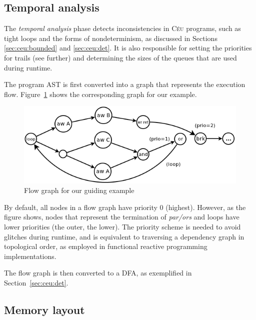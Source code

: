\documentclass[11pt,a4paper]{article}
\newcommand{\2}{\;\;}
\newcommand{\5}{\;\;\;\;\;}
\newcommand{\CEU}{\textsc{C\'{e}u}}
\begin{document}
\subsection{Temporal analysis}

The \emph{temporal analysis} phase detects inconsistencies in \CEU{} programs, 
such as tight loops and the forms of nondeterminism, as discussed in Sections 
\ref{sec:ceu:bounded} and \ref{sec:ceu:det}.
It is also responsible for setting the priorities for trails (see further) and 
determining the sizes of the queues that are used during runtime.

The program AST is first converted into a graph that represents the execution 
flow.
Figure~\ref{fig:nfa} shows the corresponding graph for our example.

\begin{figure}[ht]
\centering
\includegraphics[scale=0.40]{nfa.png}
\caption{ Flow graph for our guiding example
\label{fig:nfa}
}
\end{figure}

By default, all nodes in a flow graph have priority $0$ (highest).
However, as the figure shows, nodes that represent the termination of 
\emph{par/ors} and loops have lower priorities (the outer, the lower).
The priority scheme is needed to avoid glitches during runtime, and is 
equivalent to traversing a dependency graph in topological order, as employed 
in functional reactive programming implementations.~\cite{frtime.embedding}

The flow graph is then converted to a DFA, as exemplified in 
Section~\ref{sec:ceu:det}.

\subsection{Memory layout}
\label{sec:impl:memory}
\end{document}
